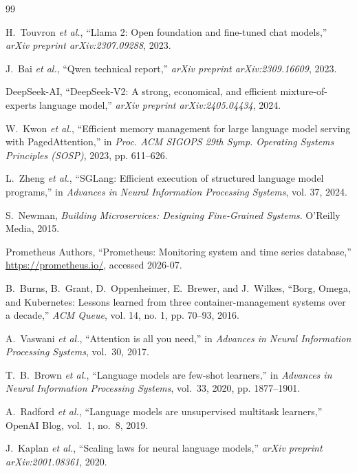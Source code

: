 \documentclass[10pt,journal]{IEEEtran}
\begin{document}
\begin{thebibliography}{99}

H.~Touvron \emph{et al.}, ``Llama 2: Open foundation and fine-tuned chat models,''
\emph{arXiv preprint arXiv:2307.09288}, 2023.

J.~Bai \emph{et al.}, ``Qwen technical report,''
\emph{arXiv preprint arXiv:2309.16609}, 2023.

DeepSeek-AI, ``DeepSeek-V2: A strong, economical, and efficient mixture-of-experts language model,''
\emph{arXiv preprint arXiv:2405.04434}, 2024.

W.~Kwon \emph{et al.}, ``Efficient memory management for large language model serving with PagedAttention,''
in \emph{Proc. ACM SIGOPS 29th Symp. Operating Systems Principles (SOSP)}, 2023, pp. 611--626.

L.~Zheng \emph{et al.}, ``SGLang: Efficient execution of structured language model programs,''
in \emph{Advances in Neural Information Processing Systems}, vol. 37, 2024.

S.~Newman, \emph{Building Microservices: Designing Fine-Grained Systems}. O'Reilly Media, 2015.

Prometheus Authors, ``Prometheus: Monitoring system and time series database,''
\url{https://prometheus.io/}, accessed 2026-07.

B.~Burns, B.~Grant, D.~Oppenheimer, E.~Brewer, and J.~Wilkes, ``Borg, Omega, and Kubernetes: Lessons learned from three container-management systems over a decade,''
\emph{ACM Queue}, vol. 14, no. 1, pp. 70--93, 2016.

A.~Vaswani \emph{et al.}, ``Attention is all you need,''
in \emph{Advances in Neural Information Processing Systems}, vol.~30, 2017.

T.~B.~Brown \emph{et al.}, ``Language models are few-shot learners,''
in \emph{Advances in Neural Information Processing Systems}, vol.~33, 2020, pp. 1877--1901.

A.~Radford \emph{et al.}, ``Language models are unsupervised multitask learners,''
OpenAI Blog, vol.~1, no.~8, 2019.

J.~Kaplan \emph{et al.}, ``Scaling laws for neural language models,''
\emph{arXiv preprint arXiv:2001.08361}, 2020.


\end{thebibliography}
\end{document}
